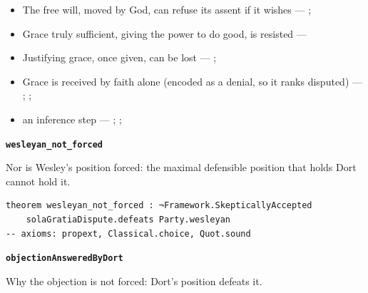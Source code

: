 \documentclass[11pt]{article}
\begin{document}
\begin{itemize}
\begin{itemize}
\item The free will, moved by God, can refuse its assent if it wishes --- \cite[Trent, Session VI (1547), canon 4]{tanner-decrees-1990}; \cite[45]{waterworth-trent-1848}
\item Grace truly sufficient, giving the power to do good, is resisted --- \cite[ch. VI]{garrigou-lagrange-grace-1952}
\item Justifying grace, once given, can be lost --- \cite[II-II q.24 a.11]{aquinas-summa-1920}; \cite[Trent, Session VI (1547), canon 23]{tanner-decrees-1990}
\item Grace is received by faith alone (encoded as a denial, so it ranks disputed) --- \cite[II-II q.4 a.3]{aquinas-summa-1920}; \cite[I-II q.113 a.4 ad 1]{aquinas-summa-1920}; \cite[Trent, Session VI (1547), canon 9]{tanner-decrees-1990}
\item an inference step --- \cite{pohle-molinism-1911}; \cite[I-II q.112 a.3]{aquinas-summa-1920}; \cite[ch. VII]{garrigou-lagrange-grace-1952}
\end{itemize}
\end{itemize}
\par\medskip\noindent\textbf{\texttt{wesleyan\_\allowbreak{}not\_\allowbreak{}forced}}\par\nobreak\noindent
Nor is Wesley’s position forced: the maximal defensible position that holds Dort cannot hold it.

{\small\begin{verbatim}
theorem wesleyan_not_forced : ¬Framework.SkepticallyAccepted
    solaGratiaDispute.defeats Party.wesleyan
-- axioms: propext, Classical.choice, Quot.sound
\end{verbatim}}
\par\medskip\noindent\textbf{\texttt{objection\allowbreak{}Answered\allowbreak{}By\allowbreak{}Dort}}\par\nobreak\noindent
Why the objection is not forced: Dort’s position defeats it.
\end{document}
